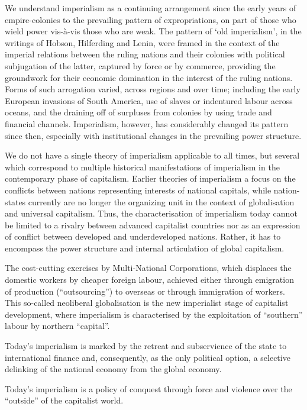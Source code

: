 \documentclass[
]{book}
\begin{document}
We understand imperialism as a continuing arrangement since the early years of empire-colonies to the prevailing pattern of expropriations, on part of those who wield power vis-à-vis those who are weak. The pattern of `old imperialism', in the writings of Hobson, Hilferding and Lenin, were framed in the context of the imperial relations between the ruling nations and their colonies with political subjugation of the latter, captured by force or by commerce, providing the groundwork for their economic domination in the interest of the ruling nations. Forms of such arrogation varied, across regions and over time; including the early European invasions of South America, use of slaves or indentured labour across oceans, and the draining off of surpluses from colonies by using trade and financial channels. Imperialism, however, has considerably changed its pattern since then, especially with institutional changes in the prevailing power structure.

We do not have a single theory of imperialism applicable to all times, but several which correspond to multiple historical manifestations of imperialism in the contemporary phase of capitalism.
Earlier theories of imperialism a focus on the conflicts between nations representing interests of national capitals, while nation-states currently are no longer the organizing unit in the context of globalisation and universal capitalism. Thus, the characterisation of imperialism today cannot be limited to a rivalry between advanced capitalist countries nor as an expression of conflict between developed and underdeveloped nations. Rather, it has to encompass the power structure and internal articulation of global capitalism.

The cost-cutting exercises by Multi-National Corporations, which displaces the domestic workers by cheaper foreign labour, achieved either through emigration of production (``outsourcing'') to overseas or through immigration of workers. This so-called neoliberal globalisation is the new imperialist stage of capitalist development, where imperialism is characterised by the exploitation of ``southern'' labour by northern ``capital''.

Today's imperialism is marked by the retreat and subservience of the state to international finance and, consequently, as the only political option, a selective delinking of the national economy from the global economy.

Today's imperialism is a policy of conquest through force and violence over the ``outside'' of the capitalist world.
\end{document}
